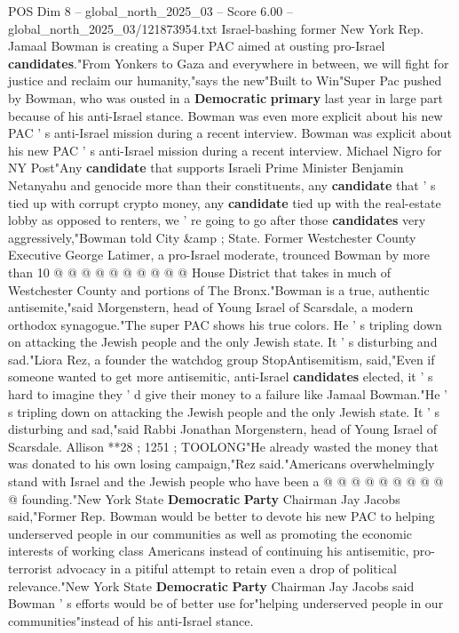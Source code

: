 \begin{textsample}{POS Dim 8 – global\_north\_2025\_03 – Score 6.00 – global\_north\_2025\_03/121873954.txt}  \label{ex:f8_pos_334}
Israel-bashing former New York Rep.
Jamaal Bowman is creating a Super PAC aimed at ousting pro-Israel \textbf{candidates}."From Yonkers to Gaza and everywhere in between, we will fight for justice and reclaim our humanity,"says the new"Built to Win"Super Pac pushed by Bowman, who was ousted in a \textbf{Democratic} \textbf{primary} last year in large part because of his anti-Israel stance.
Bowman was even more explicit about his new PAC ' s anti-Israel mission during a recent interview.
Bowman was explicit about his new PAC ' s anti-Israel mission during a recent interview.
Michael Nigro for NY Post"Any \textbf{candidate} that supports Israeli Prime Minister Benjamin Netanyahu and genocide more than their constituents, any \textbf{candidate} that ' s tied up with corrupt crypto money, any \textbf{candidate} tied up with the real-estate lobby as opposed to renters, we ' re going to go after those \textbf{candidates} very aggressively,"Bowman told City \&amp ; State.
Former Westchester County Executive George Latimer, a pro-Israel moderate, trounced Bowman by more than 10 @ @ @ @ @ @ @ @ @ @ House District that takes in much of Westchester County and portions of The Bronx."Bowman is a true, authentic antisemite,"said Morgenstern, head of Young Israel of Scarsdale, a modern orthodox synagogue."The super PAC shows his true colors.
He ' s tripling down on attacking the Jewish people and the only Jewish state.
It ' s disturbing and sad."Liora Rez, a founder the watchdog group StopAntisemitism, said,"Even if someone wanted to get more antisemitic, anti-Israel \textbf{candidates} elected, it ' s hard to imagine they ' d give their money to a failure like Jamaal Bowman."He ' s tripling down on attacking the Jewish people and the only Jewish state.
It ' s disturbing and sad,"said Rabbi Jonathan Morgenstern, head of Young Israel of Scarsdale.
Allison **28 ; 1251 ; TOOLONG"He already wasted the money that was donated to his own losing campaign,"Rez said."Americans overwhelmingly stand with Israel and the Jewish people who have been a @ @ @ @ @ @ @ @ @ @ founding."New York State \textbf{Democratic} \textbf{Party} Chairman Jay Jacobs said,"Former Rep.
Bowman would be better to devote his new PAC to helping underserved people in our communities as well as promoting the economic interests of working class Americans instead of continuing his antisemitic, pro-terrorist advocacy in a pitiful attempt to retain even a drop of political relevance."New York State \textbf{Democratic} \textbf{Party} Chairman Jay Jacobs said Bowman ' s efforts would be of better use for"helping underserved people in our communities"instead of his anti-Israel stance.

\end{textsample}
